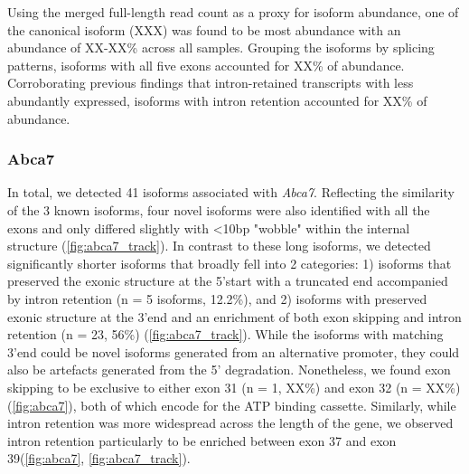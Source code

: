 Using the merged full-length read count as a proxy for isoform abundance, one of the canonical isoform (XXX) was found to be most abundance with an abundance of XX-XX\% across all samples. Grouping the isoforms by splicing patterns, isoforms with all five exons accounted for XX\% of abundance. Corroborating previous findings that intron-retained transcripts with less abundantly expressed, isoforms with intron retention accounted for XX\% of abundance.


\newpage
\subsubsection{Abca7}
In total, we detected 41 isoforms associated with \textit{Abca7}. Reflecting the similarity of the 3 known isoforms, four novel isoforms were also identified with all the exons and only differed slightly with <10bp "wobble" within the internal structure (\cref{fig:abca7_track}). In contrast to these long isoforms, we detected significantly shorter isoforms that broadly fell into 2 categories: 1) isoforms that preserved the exonic structure at the 5'start with a truncated end accompanied by intron retention (n = 5 isoforms, 12.2\%), and 2) isoforms with preserved exonic structure at the 3'end and an enrichment of both exon skipping and intron retention (n = 23, 56\%) (\cref{fig:abca7_track}). While the isoforms with matching 3'end could be novel isoforms generated from an alternative promoter, they could also be artefacts generated from the 5' degradation. Nonetheless, we found exon skipping to be exclusive to either exon 31 (n = 1, XX\%) and exon 32 (n = XX\%) (\cref{fig:abca7}), both of which encode for the ATP binding cassette. Similarly, while intron retention was more widespread across the length of the gene, we observed intron retention particularly to be enriched between exon 37 and exon 39(\cref{fig:abca7}, \cref{fig:abca7_track}). 


